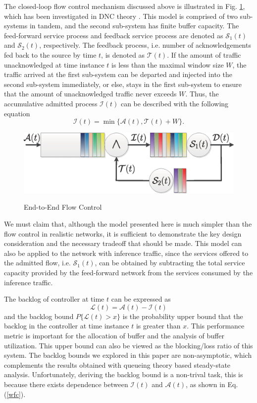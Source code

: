 \documentclass[paper]{ieice}
\begin{document}
The closed-loop flow control mechanism discussed above is illustrated in Fig. \ref{control1}, which has been investigated in DNC theory \cite{CrOk96,AgRa96,Chan98,ACOR99,QLDD09FC,bose2006analysis,Qian2010Analysis}. This model is comprised of two sub-systems in tandem, and the second sub-system has finite buffer capacity. The feed-forward service process and feedback service process are denoted as $\mathcal{S}_1(t)$ and $\mathcal{S}_2(t)$, respectively. The feedback process, i.e. number of acknowledgements fed back to the source by time $t$, is denoted as $\mathcal{T}(t)$. If the amount of traffic unacknowledged at time instance $t$ is less than the maximal window size $W$, the traffic arrived at the first sub-system can be departed and injected into the second sub-system immediately, or else, stays in the first sub-system to ensure that the amount of unacknowledged traffic never exceeds $W$. Thus, the accumulative admitted process $\mathcal{I}(t)$ can be described with the following equation
\begin{equation}\label{wfc}
\mathcal{I}(t)=\min\{\mathcal{A}(t),\mathcal{T}(t)+W\}.
\end{equation}
\begin{figure}[ht]
  \centering\includegraphics[scale=0.45]{figures/QueueModel1.eps}\\
  \caption{End-to-End Flow Control}\label{control1}
\end{figure}

We must claim that, although the model presented here is much simpler than the flow control in realistic networks, it is sufficient to demonstrate the key design consideration and the necessary tradeoff that should be made. This model can also be applied to the network with inference traffic, since the services offered to the admitted flow, i.e. $\mathcal{S}_1(t)$, can be obtained by subtracting the total service capacity provided by the feed-forward network from the services consumed by the inference traffic.

The backlog of controller at time $t$ can be expressed as $$\mathcal{L}(t)=\mathcal{A}(t)-\mathcal{I}(t)$$ and the backlog bound $P\{\mathcal{L}(t)>x\}$ is the probability upper bound that the backlog in the controller at time instance $t$ is greater than $x$. This performance metric is important for the allocation of buffer and the analysis of buffer utilization. This upper bound can also be viewed as the blocking/loss ratio of this system. The backlog bounds we explored in this paper are non-asymptotic, which complements the results obtained with queueing theory based steady-state analysis. Unfortunately, deriving the backlog bound is a non-trival task, this is because there exists dependence between $\mathcal{I}(t)$ and $\mathcal{A}(t)$, as shown in Eq.(\ref{wfc}).
\end{document}
